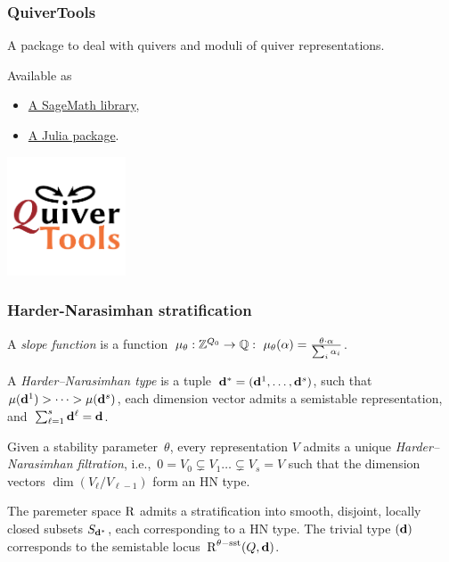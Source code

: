 \documentclass{beamer}
\begin{document}
\begin{frame}
    \frametitle{QuiverTools}
A package to deal with quivers and moduli of quiver representations. \pause

Available as

\begin{itemize}
    \item \href{quivertools.github.io/QuiverTools}{A SageMath library},
    \item \href{quivertools.github.io/QuiverTools.jl}{A Julia package}.
\end{itemize}\pause
\begin{center}
\includegraphics[width=100pt]{quivertools-logo.png}
\end{center}
\end{frame}

\begin{frame}
    \frametitle{Harder-Narasimhan stratification}
A \emph{slope function} is a function~$\mu_{\theta} : \mathbb{Z}^{Q_0} \overset{}{\rightarrow} \mathbb{Q}: ~\mu_{\theta}(\alpha) = \frac{\theta \cdot \alpha}{\sum_i \alpha_i}$. \pause
\begin{definition}

A \emph{Harder--Narasimhan type} is a
tuple~$\mathbf{d}^* = (\mathbf{d}^1,\dots,\mathbf{d}^s)$, such
that~$\mu(\mathbf{d}^1) > \dots > \mu(\mathbf{d}^s)$, each dimension
vector admits a semistable representation,
and~$\sum_{\ell = 1}^{s}\mathbf{d}^{\ell} = \mathbf{d}$. \pause

Given a stability parameter~$\theta$, every representation $V$
admits a unique \emph{Harder--Narasimhan filtration},
i.e.,~$0 = V_0 \subsetneq V_1 \dots \subsetneq V_s = V$ such that the
dimension vectors $\dim(V_{\ell}/V_{\ell-1})$ form an HN type.
\end{definition} \pause

\begin{theorem}[Reineke]
The paremeter space $\operatorname{R}$ admits a stratification into
smooth, disjoint, locally closed subsets $S_{\mathbf{d}^*}$, each corresponding
to a HN type. The trivial type $(\mathbf{d})$ corresponds to the semistable
locus~$\operatorname{R}^{\theta-\mathrm{sst}}(Q, \mathbf{d})$.
\end{theorem}

\end{frame}
\end{document}
